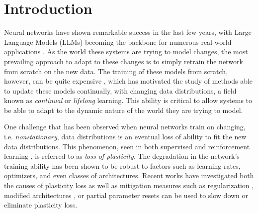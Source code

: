 \section{Introduction}



Neural networks have shown remarkable success in the last few years, with Large Language
Models (LLMs) becoming the backbone for numerous real-world applications \citep{}. As
the world these systems are trying to model changes, the most prevailing approach to
adapt to these changes is to simply retrain the network from scratch on the new data.
The training of these models from scratch, however, can be quite expensive \citep{},
which has motivated the study of methods able to update these models continually, with changing data distributions, a
field known as \emph{continual} or \emph{lifelong} learning. This ability is critical to
allow systems to be able to adapt to the dynamic nature of the world they are trying to
model.

One challenge that has been observed when neural networks train on changing, i.e.
\emph{nonstationary}, data distributions is an eventual loss of ability to fit the new
data distributions. This phenomenon, seen in both supervised \citep{} and reinforcement
learning \citep{}, is referred to as \emph{loss of plasticity}. The degradation in the
network's training ability has been shown to be robust to factors such as learning
rates, optimizers, and even classes of architectures.
Recent works have
investigated both the causes of plasticity loss \citep{} as well as mitigation measures
such as regularization \citep{}, modified architectures \citep{}, or partial parameter resets \citep{} can be used
to slow down or eliminate plasticity loss.

